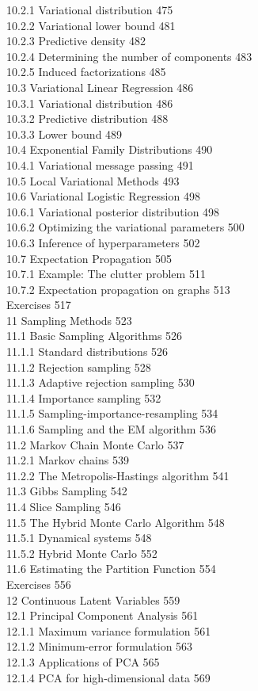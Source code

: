 \documentclass[
  10
]{article}
\begin{document}
10.2.1 Variational distribution 475\\
10.2.2 Variational lower bound 481\\
10.2.3 Predictive density 482\\
10.2.4 Determining the number of components 483\\
10.2.5 Induced factorizations 485\\
10.3 Variational Linear Regression 486\\
10.3.1 Variational distribution 486\\
10.3.2 Predictive distribution 488\\
10.3.3 Lower bound 489\\
10.4 Exponential Family Distributions 490\\
10.4.1 Variational message passing 491\\
10.5 Local Variational Methods 493\\
10.6 Variational Logistic Regression 498\\
10.6.1 Variational posterior distribution 498\\
10.6.2 Optimizing the variational parameters 500\\
10.6.3 Inference of hyperparameters 502\\
10.7 Expectation Propagation 505\\
10.7.1 Example: The clutter problem 511\\
10.7.2 Expectation propagation on graphs 513\\
Exercises 517\\
11 Sampling Methods 523\\
11.1 Basic Sampling Algorithms 526\\
11.1.1 Standard distributions 526\\
11.1.2 Rejection sampling 528\\
11.1.3 Adaptive rejection sampling 530\\
11.1.4 Importance sampling 532\\
11.1.5 Sampling-importance-resampling 534\\
11.1.6 Sampling and the EM algorithm 536\\
11.2 Markov Chain Monte Carlo 537\\
11.2.1 Markov chains 539\\
11.2.2 The Metropolis-Hastings algorithm 541\\
11.3 Gibbs Sampling 542\\
11.4 Slice Sampling 546\\
11.5 The Hybrid Monte Carlo Algorithm 548\\
11.5.1 Dynamical systems 548\\
11.5.2 Hybrid Monte Carlo 552\\
11.6 Estimating the Partition Function 554\\
Exercises 556\\
12 Continuous Latent Variables 559\\
12.1 Principal Component Analysis 561\\
12.1.1 Maximum variance formulation 561\\
12.1.2 Minimum-error formulation 563\\
12.1.3 Applications of PCA 565\\
12.1.4 PCA for high-dimensional data 569
\end{document}
